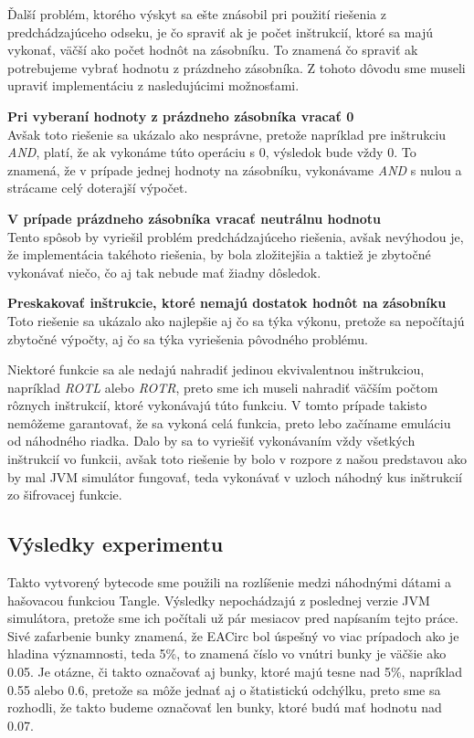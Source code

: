 Ďalší problém, ktorého výskyt sa ešte znásobil pri použití riešenia z predchádzajúceho odseku, je čo spraviť ak je počet inštrukcií, ktoré sa majú vykonať, väčší ako počet hodnôt na zásobníku. To znamená čo spraviť ak potrebujeme vybrať hodnotu z prázdneho zásobníka. Z tohoto dôvodu sme museli upraviť implementáciu z nasledujúcimi možnosťami.

\begin{myItemize}
 \item \textbf{Pri vyberaní hodnoty z prázdneho zásobníka vracať 0}\\Avšak toto riešenie sa ukázalo ako nesprávne, pretože napríklad pre inštrukciu \textit{AND}, platí, že ak vykonáme túto operáciu s 0, výsledok bude vždy 0. To znamená, že v prípade jednej hodnoty na zásobníku, vykonávame \textit{AND} s nulou a strácame celý doterajší výpočet.
 \item \textbf{V prípade prázdneho zásobníka vracať neutrálnu hodnotu}\\Tento spôsob by vyriešil problém predchádzajúceho riešenia, avšak nevýhodou je, že implementácia takéhoto riešenia, by bola zložitejšia a taktiež je zbytočné vykonávať niečo, čo aj tak nebude mať žiadny dôsledok. 
 \item \textbf{Preskakovať inštrukcie, ktoré nemajú dostatok hodnôt na zásobníku}\\Toto riešenie sa ukázalo ako najlepšie aj čo sa týka výkonu, pretože sa nepočítajú zbytočné výpočty, aj čo sa týka vyriešenia pôvodného problému.  
\end{myItemize}

Niektoré funkcie sa ale nedajú nahradiť jedinou ekvivalentnou inštrukciou, napríklad \textit{ROTL} alebo \textit{ROTR}, preto sme ich museli nahradiť väčším počtom rôznych inštrukcií, ktoré vykonávajú túto funkciu. V tomto prípade takisto nemôžeme garantovať, že sa vykoná celá funkcia, preto lebo začíname emuláciu od náhodného riadka. Dalo by sa to vyriešiť vykonávaním vždy všetkých inštrukcií vo funkcii, avšak toto riešenie by bolo v rozpore z našou predstavou ako by mal JVM simulátor fungovať, teda vykonávať v uzloch náhodný kus inštrukcií zo šifrovacej funkcie. 

\subsection{Výsledky experimentu}
\label{subsec:exp1-results}

Takto vytvorený bytecode sme použili na rozlíšenie medzi náhodnými dátami a hašovacou funkciou Tangle. Výsledky nepochádzajú z poslednej verzie JVM simulátora, pretože sme ich počítali už pár mesiacov pred napísaním tejto práce. Sivé zafarbenie bunky znamená, že EACirc bol úspešný vo viac prípadoch ako je hladina významnosti, teda 5\%, to znamená číslo vo vnútri bunky je väčšie ako 0.05. Je otázne, či takto označovať aj bunky, ktoré majú tesne nad 5\%, napríklad 0.55 alebo 0.6, pretože sa môže jednať aj o štatistickú odchýlku, preto sme sa rozhodli, že takto budeme označovať len bunky, ktoré budú mať hodnotu nad 0.07. 
 
